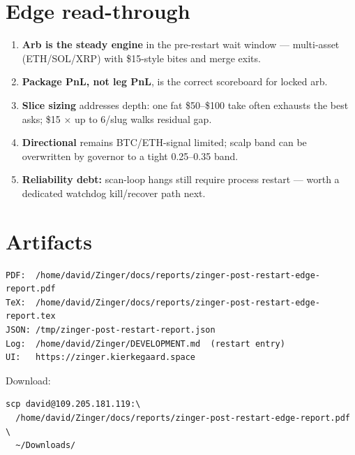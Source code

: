 \documentclass[11pt,a4paper]{article}
\begin{document}
\section{Edge read-through}
\begin{enumerate}[leftmargin=*,itemsep=0.35em]
  \item \textbf{Arb is the steady engine} in the pre-restart wait window --- multi-asset (ETH/SOL/XRP) with \$15-style bites and merge exits.
  \item \textbf{Package PnL, not leg PnL}, is the correct scoreboard for locked arb.
  \item \textbf{Slice sizing} addresses depth: one fat \$50--\$100 take often exhausts the best asks; \$15 $\times$ up to 6/slug walks residual gap.
  \item \textbf{Directional} remains BTC/ETH-signal limited; scalp band can be overwritten by governor to a tight 0.25--0.35 band.
  \item \textbf{Reliability debt:} scan-loop hangs still require process restart --- worth a dedicated watchdog kill/recover path next.
\end{enumerate}

\section{Artifacts}
\begin{verbatim}
PDF:  /home/david/Zinger/docs/reports/zinger-post-restart-edge-report.pdf
TeX:  /home/david/Zinger/docs/reports/zinger-post-restart-edge-report.tex
JSON: /tmp/zinger-post-restart-report.json
Log:  /home/david/Zinger/DEVELOPMENT.md  (restart entry)
UI:   https://zinger.kierkegaard.space
\end{verbatim}

\noindent
Download:
\begin{verbatim}
scp david@109.205.181.119:\
  /home/david/Zinger/docs/reports/zinger-post-restart-edge-report.pdf \
  ~/Downloads/
\end{verbatim}
\end{document}

